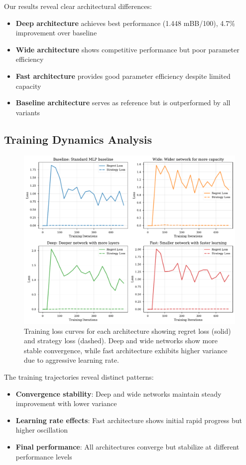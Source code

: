 \documentclass{article}
\begin{document}
Our results reveal clear architectural differences:

\begin{itemize}
\item \textbf{Deep architecture} achieves best performance (1.448 mBB/100), 4.7\% improvement over baseline
\item \textbf{Wide architecture} shows competitive performance but poor parameter efficiency
\item \textbf{Fast architecture} provides good parameter efficiency despite limited capacity
\item \textbf{Baseline architecture} serves as reference but is outperformed by all variants
\end{itemize}

\subsection{Training Dynamics Analysis}

\begin{figure}[t]
\centering
\includegraphics[width=\textwidth]{figures/loss_curves}
\caption{Training loss curves for each architecture showing regret loss (solid) and strategy loss (dashed). Deep and wide networks show more stable convergence, while fast architecture exhibits higher variance due to aggressive learning rate.}
\label{fig:loss_curves}
\end{figure}

The training trajectories reveal distinct patterns:

\begin{itemize}
\item \textbf{Convergence stability}: Deep and wide networks maintain steady improvement with lower variance
\item \textbf{Learning rate effects}: Fast architecture shows initial rapid progress but higher oscillation
\item \textbf{Final performance}: All architectures converge but stabilize at different performance levels
\end{itemize}
\end{document}
